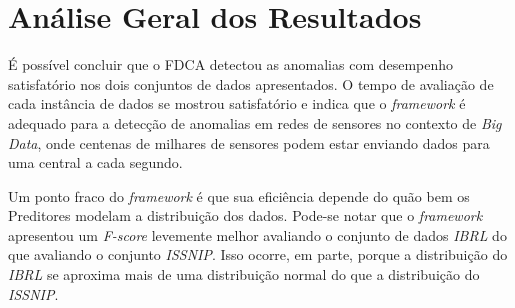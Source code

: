 \documentclass[cic,tc]{iiufrgs}
\begin{document}
\bigskip
\begin{table}[h]
\begin{adjustwidth}{-.5in}{-.5in}
    \caption{Avaliação do FDCA com agrupamento por modelagem de mistura Gaussiana para o conjunto de dados \textit{IBRL}}
    \bigskip
    \begin{center}
    \label{av_gaussian_ibrl}
    \end{center}
\end{adjustwidth}
\end{table}

\section{Análise Geral dos Resultados}
É possível concluir que o FDCA detectou as anomalias com desempenho satisfatório nos dois conjuntos de dados apresentados. O tempo de avaliação de cada instância de dados se mostrou satisfatório e indica que o \textit{framework} é adequado para a detecção de anomalias em redes de sensores no contexto de \textit{Big Data}, onde centenas de milhares de sensores podem estar enviando dados para uma central a cada segundo.

Um ponto fraco do \textit{framework} é que sua eficiência depende do quão bem os Preditores modelam a distribuição dos dados. Pode-se notar que o \textit{framework} apresentou um \textit{F-score} levemente melhor avaliando o conjunto de dados \textit{IBRL} do que avaliando o conjunto \textit{ISSNIP}. Isso ocorre, em parte, porque a distribuição do \textit{IBRL} se aproxima mais de uma distribuição normal do que a distribuição do \textit{ISSNIP}.
\end{document}
